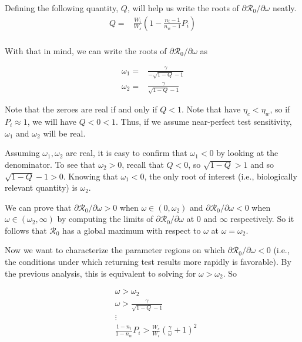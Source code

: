 \documentclass[12pt]{article}
\newcommand{\Rnum}{\mathcal{R}_0}
\theoremstyle{definition} %
\begin{document}
Defining the following quantity, $Q$, will help us write the roots of $\partial{\Rnum}/\partial{\omega}$ neatly. 
\begin{align}\label{eq:defQ}
    Q =& \frac{W_i}{W_s}\left(1-\frac{n_{t}-1}{n_{w}-1}P_{i}\right) \\
\end{align}

With that in mind, we can write the roots of $\partial{\Rnum}/\partial{\omega}$ as

\begin{align}
    \omega_1 =& \frac{\gamma}{-\sqrt{1-Q}-1} \\
    \omega_2 =& \frac{\gamma}{\sqrt{1-Q}-1}
\end{align}

Note that the zeroes are real if and only if $Q < 1$. Note that have $\eta_c < \eta_w$, so if $P_i \approx 1$, we will have $Q < 0 < 1$. Thus, if we assume near-perfect test sensitivity, $\omega_1$ and $\omega_2$ will be real. 

Assuming $\omega_1, \omega_2$ are real, it is easy to confirm that $\omega_1 < 0$ by looking at the denominator. To see that $\omega_2 > 0$, recall that $Q < 0$, so $\sqrt{1-Q} > 1$ and so $\sqrt{1-Q} -1 > 0$. Knowing that $\omega_1 < 0$, the only root of interest (i.e., biologically relevant quantity) is $\omega_2$. 

We can prove that $\partial{\Rnum}/\partial{\omega} > 0$ when $\omega \in (0,\omega_2)$ and $\partial{\Rnum}/\partial{\omega} < 0$ when $\omega \in (\omega_2,\infty)$ by computing the limits of $\partial{\Rnum}/\partial{\omega}$ at $0$ and $\infty$ respectively. So it follows that $\Rnum$ has a global maximum with respect to $\omega$ at $\omega = \omega_2$.

Now we want to characterize the parameter regions on which $\partial{\Rnum}/\partial{\omega} < 0$ (i.e., the conditions under which returning test results more rapidly is favorable). By the previous analysis, this is equivalent to solving for $\omega > \omega_2$. So

\begin{align}\label{eq:necsuf}
    &\omega > \omega_2 \nonumber \\
    &\omega > \frac{\gamma}{\sqrt{1-Q}-1} \nonumber \\
    &\vdots \nonumber \\
    &\frac{1-n_{t}}{1-n_{w}}P_{i}>\frac{W_{s}}{W_{i}}\left(\frac{\gamma}{\omega}+1\right)^{2}
\end{align}
\end{document}
